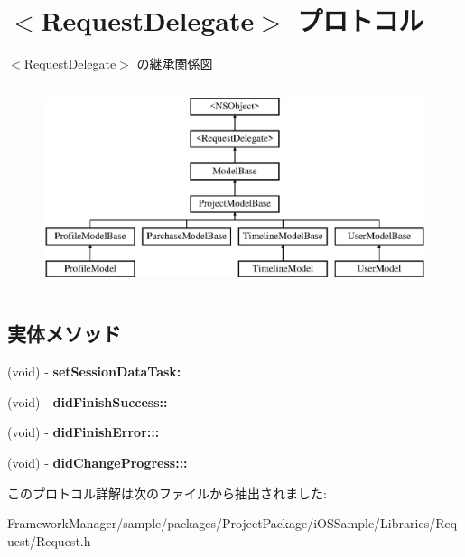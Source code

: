 \hypertarget{protocol_request_delegate-p}{}\section{$<$Request\+Delegate$>$ プロトコル}
\label{protocol_request_delegate-p}
$<$Request\+Delegate$>$ の継承関係図\begin{figure}[H]
\begin{center}
\leavevmode
\includegraphics[height=6.000000cm]{protocol_request_delegate-p}
\end{center}
\end{figure}
\subsection*{実体メソッド}
\begin{DoxyCompactItemize}
\item 
\hypertarget{protocol_request_delegate-p_af33bbfeff5359aebbfa74a351702b809}{}(void) -\/ {\bfseries set\+Session\+Data\+Task\+:}\label{protocol_request_delegate-p_af33bbfeff5359aebbfa74a351702b809}

\item 
\hypertarget{protocol_request_delegate-p_a697a71705bdc1c5e9512560e51216e34}{}(void) -\/ {\bfseries did\+Finish\+Success\+::}\label{protocol_request_delegate-p_a697a71705bdc1c5e9512560e51216e34}

\item 
\hypertarget{protocol_request_delegate-p_a6c417ec47754b1f2efb79c656d22670b}{}(void) -\/ {\bfseries did\+Finish\+Error\+:::}\label{protocol_request_delegate-p_a6c417ec47754b1f2efb79c656d22670b}

\item 
\hypertarget{protocol_request_delegate-p_a2af1592d77b1d9050aa623f31a005b00}{}(void) -\/ {\bfseries did\+Change\+Progress\+:::}\label{protocol_request_delegate-p_a2af1592d77b1d9050aa623f31a005b00}

\end{DoxyCompactItemize}


このプロトコル詳解は次のファイルから抽出されました\+:\begin{DoxyCompactItemize}
\item 
Framework\+Manager/sample/packages/\+Project\+Package/i\+O\+S\+Sample/\+Libraries/\+Request/Request.\+h\end{DoxyCompactItemize}
